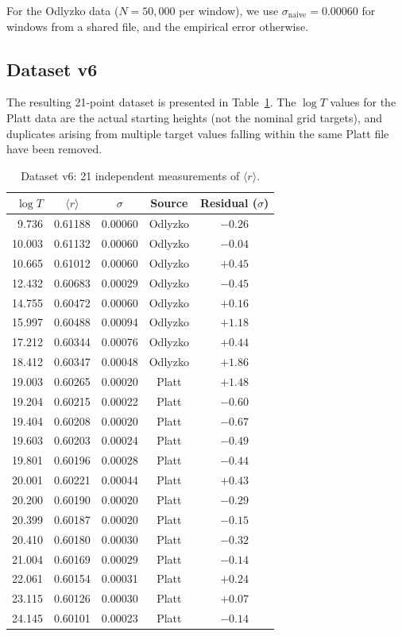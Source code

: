 \documentclass[11pt]{article}
\theoremstyle{plain}
\theoremstyle{remark}
\begin{document}
For the Odlyzko data ($N = 50{,}000$ per window), we use
$\sigma_{\mathrm{naive}} = 0.00060$ for windows from a shared file,
and the empirical error otherwise.

\subsection{Dataset v6}

The resulting 21-point dataset is presented in Table~\ref{tab:dataset}.
The $\log T$ values for the Platt data are the actual starting heights
(not the nominal grid targets), and duplicates arising from multiple
target values falling within the same Platt file have been removed.

\begin{table}[ht]
\centering
\caption{Dataset v6: 21 independent measurements of $\langle r\rangle$.}
\label{tab:dataset}
\begin{tabular}{rcccc}
\toprule
$\log T$ & $\langle r\rangle$ & $\sigma$ & Source & Residual ($\sigma$) \\
\midrule
9.736  & 0.61188 & 0.00060 & Odlyzko & $-0.26$ \\
10.003 & 0.61132 & 0.00060 & Odlyzko & $-0.04$ \\
10.665 & 0.61012 & 0.00060 & Odlyzko & $+0.45$ \\
12.432 & 0.60683 & 0.00029 & Odlyzko & $-0.45$ \\
14.755 & 0.60472 & 0.00060 & Odlyzko & $+0.16$ \\
15.997 & 0.60488 & 0.00094 & Odlyzko & $+1.18$ \\
17.212 & 0.60344 & 0.00076 & Odlyzko & $+0.44$ \\
18.412 & 0.60347 & 0.00048 & Odlyzko & $+1.86$ \\
\midrule
19.003 & 0.60265 & 0.00020 & Platt & $+1.48$ \\
19.204 & 0.60215 & 0.00022 & Platt & $-0.60$ \\
19.404 & 0.60208 & 0.00020 & Platt & $-0.67$ \\
19.603 & 0.60203 & 0.00024 & Platt & $-0.49$ \\
19.801 & 0.60196 & 0.00028 & Platt & $-0.44$ \\
20.001 & 0.60221 & 0.00044 & Platt & $+0.43$ \\
20.200 & 0.60190 & 0.00020 & Platt & $-0.29$ \\
20.399 & 0.60187 & 0.00020 & Platt & $-0.15$ \\
20.410 & 0.60180 & 0.00030 & Platt & $-0.32$ \\
21.004 & 0.60169 & 0.00029 & Platt & $-0.14$ \\
22.061 & 0.60154 & 0.00031 & Platt & $+0.24$ \\
23.115 & 0.60126 & 0.00030 & Platt & $+0.07$ \\
24.145 & 0.60101 & 0.00023 & Platt & $-0.14$ \\
\bottomrule
\end{tabular}
\end{table}
\end{document}
